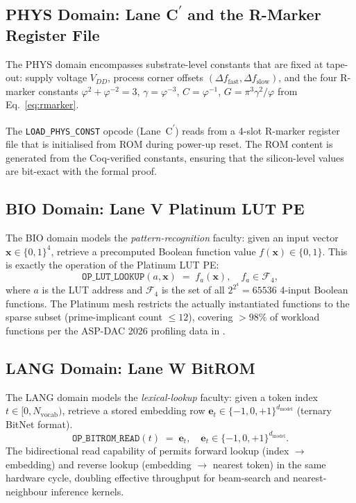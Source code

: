 \subsection{PHYS Domain: Lane C\textsuperscript{$\prime$} and the R-Marker Register File}

The PHYS domain encompasses substrate-level constants that are fixed at tape-out:
supply voltage $V_{DD}$, process corner offsets $(\Delta f_{\text{fast}}, \Delta f_{\text{slow}})$,
and the four R-marker constants
$\varphi^{2}+\varphi^{-2}=3$, $\gamma=\varphi^{-3}$, $C=\varphi^{-1}$, $G=\pi^{3}\gamma^{2}/\varphi$
from Eq.~\eqref{eq:rmarker}.

The \texttt{LOAD\_PHYS\_CONST} opcode (Lane~C\textsuperscript{$\prime$}) reads from a
4-slot R-marker register file that is initialised from ROM during power-up reset.
The ROM content is generated from the Coq-verified constants, ensuring that the
silicon-level values are bit-exact with the formal proof.

\subsection{BIO Domain: Lane V Platinum LUT PE}

The BIO domain models the \emph{pattern-recognition} faculty: given an input
vector $\mathbf{x} \in \{0,1\}^{4}$, retrieve a precomputed Boolean function
value $f(\mathbf{x}) \in \{0,1\}$.
This is exactly the operation of the Platinum LUT PE:
%
\begin{equation}
  \label{eq:lut-lookup}
  \texttt{OP\_LUT\_LOOKUP}(a, \mathbf{x}) \;=\; f_{a}(\mathbf{x}),
  \quad f_{a} \in \mathcal{F}_{4},
\end{equation}
%
where $a$ is the LUT address and $\mathcal{F}_{4}$ is the set of all
$2^{2^{4}} = 65536$ 4-input Boolean functions.
The Platinum mesh restricts the actually instantiated functions to the sparse
subset (prime-implicant count $\leq 12$), covering $> 98\%$ of workload functions
per the ASP-DAC 2026 profiling data in \cite{platinum_lut_pe_2026}.

\subsection{LANG Domain: Lane W BitROM}

The LANG domain models the \emph{lexical-lookup} faculty: given a token index
$t \in [0, N_{\text{vocab}})$, retrieve a stored embedding row
$\mathbf{e}_t \in \{-1,0,+1\}^{d_{\text{model}}}$ (ternary BitNet format).
%
\begin{equation}
  \label{eq:bitrom-read}
  \texttt{OP\_BITROM\_READ}(t) \;=\; \mathbf{e}_t,
  \quad \mathbf{e}_t \in \{-1,0,+1\}^{d_{\text{model}}}.
\end{equation}
%
The bidirectional read capability of \cite{bitrom_2025} permits forward
lookup (index $\to$ embedding) and reverse lookup (embedding $\to$ nearest token)
in the same hardware cycle, doubling effective throughput for beam-search and
nearest-neighbour inference kernels.

